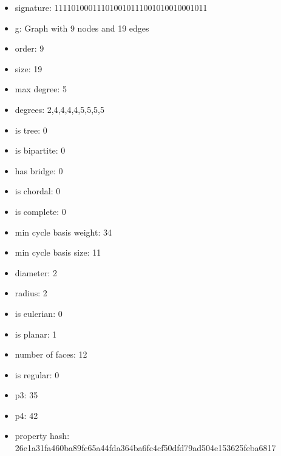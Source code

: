 \newpage
\begin{figure}
\end{figure}
\begin{itemize}
\item signature: 111101000111010010111001010010001011
\item g: Graph with 9 nodes and 19 edges
\item order: 9
\item size: 19
\item max degree: 5
\item degrees: 2,4,4,4,4,5,5,5,5
\item is tree: 0
\item is bipartite: 0
\item has bridge: 0
\item is chordal: 0
\item is complete: 0
\item min cycle basis weight: 34
\item min cycle basis size: 11
\item diameter: 2
\item radius: 2
\item is eulerian: 0
\item is planar: 1
\item number of faces: 12
\item is regular: 0
\item p3: 35
\item p4: 42
\item property hash: 26e1a31fa460ba89fc65a44fda364ba6fc4cf50dfd79ad504e153625feba6817
\end{itemize}
